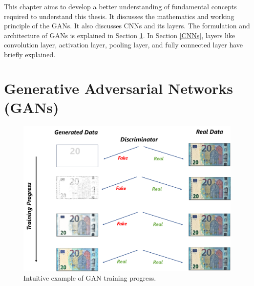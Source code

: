 \justifying
\setlength{\parskip}{1em}

This chapter aims to develop a better understanding of fundamental concepts required to understand this thesis. It discusses the mathematics and working principle of the \acp{GAN}. It also discusses \acp{CNN} and its layers. The formulation and architecture of \acp{GAN} is explained in Section \ref{GenerativeAdversarialNetworks}. In Section \ref{CNNs}, layers like convolution layer, activation layer, pooling layer, and fully connected layer have briefly explained.


\section{Generative Adversarial Networks (GANs)}\label{GenerativeAdversarialNetworks}

\begin{figure}[H]
        \begin{center}
	    \includegraphics[scale=0.25]{images/Fundamentals/GANTrainingintuition.png}
	    \caption[Intuitive example of \ac{GAN} training progress.]{Intuitive example of \ac{GAN} training progress.}
	    \label{fig:GANTrainingintuition}
	    \end{center}
\end{figure}

